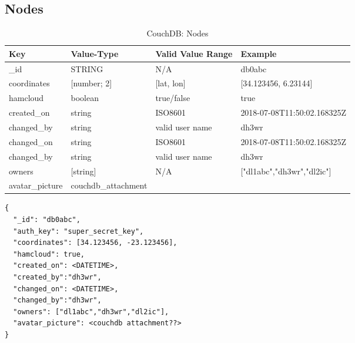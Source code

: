 \subsection{Nodes}
\begin{table}[h]
 \caption{CouchDB: Nodes}
 \begin{tabular}{|l|l|l|l|} \hline
  Key & Value-Type & Valid Value Range & Example \\
  \hline
  \_id & STRING & N/A & db0abc \\
  coordinates & [number; 2]  & [lat, lon] & [34.123456, 6.23144] \\
  hamcloud & boolean & true/false & true \\
  created\_on & string & ISO8601 & 2018-07-08T11:50:02.168325Z \\
  changed\_by & string & valid user name & dh3wr \\
  changed\_on & string & ISO8601 & 2018-07-08T11:50:02.168325Z \\
  changed\_by & string & valid user name & dh3wr \\
  owners & [string] & N/A & ["dl1abc","dh3wr","dl2ic"] \\
  avatar\_picture & couchdb\_attachment & & \\ \hline
  \end{tabular}
  \label{tab:couchdb:nodes}
\end{table}

\begin{lstlisting}
{
  "_id": "db0abc",
  "auth_key": "super_secret_key",
  "coordinates": [34.123456, -23.123456],
  "hamcloud": true,
  "created_on": <DATETIME>,
  "created_by":"dh3wr",
  "changed_on": <DATETIME>,
  "changed_by":"dh3wr",
  "owners": ["dl1abc","dh3wr","dl2ic"],
  "avatar_picture": <couchdb attachment??>
}
\end{lstlisting}

